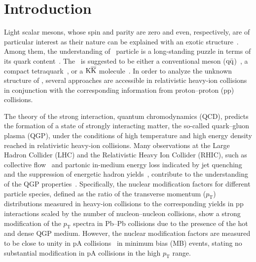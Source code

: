 
\section{Introduction}

Light scalar mesons, whose spin and parity are zero and even, respectively, are of particular interest as their nature can be explained with an exotic structure~\cite{ParticleDataGroup:2022pth}. Among them, the understanding of \fzero\ particle is a long-standing puzzle in terms of its quark content~\cite{ExHIC:2010gcb, Jaffe:1976ig, Maiani:2004uc}. The \fzero\ is suggested to be either a conventional meson ($\rm{}q\bar{q}$)~\cite{Chen:2003za}, a compact tetraquark~\cite{Achasov:2020aun}, or a $\rm{}K\overline{K}$ molecule~\cite{Ahmed:2020kmp}. In order to analyze the unknown structure of \fzero, several approaches are accessible in relativistic heavy-ion collisions in conjunction with the corresponding information from proton--proton (pp) collisions. 

The theory of the strong interaction, quantum chromodynamics (QCD), predicts the formation of a state of strongly interacting matter, the so-called quark--gluon plasma (QGP), under the conditions of high temperature and high energy density reached in relativistic heavy-ion collisions. Many observations at the Large Hadron Collider (LHC) and the Relativistic Heavy Ion Collider (RHIC), such as collective flow~\cite{Bhalerao:2020ulk, ALICE:2019zfl, Adams:2005dq, Adcox:2004mh} and partonic in-medium energy loss indicated by jet quenching~\cite{ALICE:2019qyj, ATLAS:2010isq, PHENIX:2010nlr} and the suppression of energetic hadron yields~\cite{ALICE:2019hno, PHENIX:2006ujp}, contribute to the understanding of the QGP properties~\cite{Heinz:2000bk, ALICE:2022wpn}. Specifically, the nuclear modification factors for different particle species, defined as the ratio of the transverse momentum ($p_{\mathrm{T}}$) distributions measured in heavy-ion collisions to the corresponding yields in pp interactions scaled by the number of nucleon--nucleon collisions, show a strong modification of the $p_{\mathrm{T}}$ spectra in Pb--Pb collisions due to the presence of the hot and dense QGP medium. However, the nuclear modification factors are measured to be close to unity in pA collisions~\cite{ALICE:2016dei} in minimum bias (MB) events, stating no substantial modification in pA collisions in the high $p_{\mathrm{T}}$ range. 

